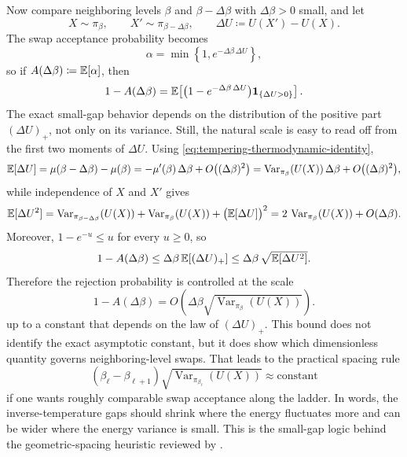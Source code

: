 Now compare neighboring levels $\beta$ and $\beta-\Delta\beta$ with $\Delta\beta>0$ small, and let
\[
  X \sim \pi_\beta,
  \qquad
  X' \sim \pi_{\beta-\Delta\beta},
  \qquad
  \Delta U \coloneqq U(X') - U(X).
\]
The swap acceptance probability becomes
\[
  \alpha
  =
  \min\!\left\{1,e^{-\Delta\beta\,\Delta U}\right\},
\]
so if $A(\Delta\beta)\coloneqq \mathbb{E}[\alpha]$, then
\[
  1-A(\Delta\beta)
  =
  \mathbb{E}\!\left[
    \bigl(1-e^{-\Delta\beta\,\Delta U}\bigr)\mathbf{1}_{\{\Delta U>0\}}
  \right].
\]
The exact small-gap behavior depends on the distribution of the positive part $(\Delta U)_+$, not only on its variance.
Still, the natural scale is easy to read off from the first two moments of $\Delta U$.
Using \eqref{eq:tempering-thermodynamic-identity},
\[
  \mathbb{E}[\Delta U]
  =
  \mu(\beta-\Delta\beta)-\mu(\beta)
  =
  -\mu'(\beta)\,\Delta\beta + O\bigl((\Delta\beta)^2\bigr)
  =
  \operatorname{Var}_{\pi_\beta}(U(X))\,\Delta\beta + O\bigl((\Delta\beta)^2\bigr),
\]
while independence of $X$ and $X'$ gives
\[
  \mathbb{E}[\Delta U^2]
  =
  \operatorname{Var}_{\pi_{\beta-\Delta\beta}}(U(X))
  +
  \operatorname{Var}_{\pi_\beta}(U(X))
  +
  \bigl(\mathbb{E}[\Delta U]\bigr)^2
  =
  2\,\operatorname{Var}_{\pi_\beta}(U(X)) + O(\Delta\beta).
\]
Moreover, $1-e^{-u}\le u$ for every $u\ge 0$, so
\[
  1-A(\Delta\beta)
  \le
  \Delta\beta\,\mathbb{E}[(\Delta U)_+]
  \le
  \Delta\beta\,\sqrt{\mathbb{E}[\Delta U^2]}.
\]
Therefore the rejection probability is controlled at the scale
\begin{equation}
  1-A(\Delta\beta)
  =
  O\!\left(\Delta\beta\sqrt{\operatorname{Var}_{\pi_\beta}(U(X))}\right).
  \label{eq:tempering-small-gap-scaling}
\end{equation}
up to a constant that depends on the law of $(\Delta U)_+$.
This bound does not identify the exact asymptotic constant, but it does show which dimensionless quantity governs neighboring-level swaps.
That leads to the practical spacing rule
\begin{equation}
  (\beta_\ell-\beta_{\ell+1})
  \sqrt{\operatorname{Var}_{\pi_{\beta_\ell}}(U(X))}
  \approx
  \text{constant}
  \label{eq:tempering-variance-spacing}
\end{equation}
if one wants roughly comparable swap acceptance along the ladder.
In words, the inverse-temperature gaps should shrink where the energy fluctuates more and can be wider where the energy variance is small.
This is the small-gap logic behind the geometric-spacing heuristic reviewed by \citet[\S2.3]{earl_deem_2005_parallel_tempering}.

